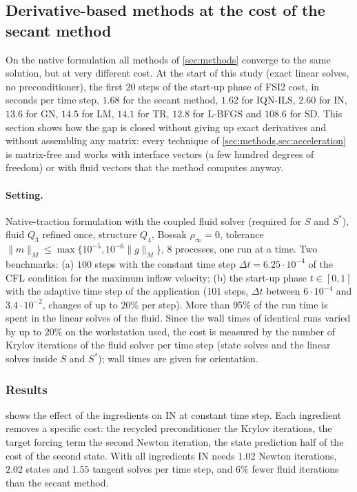 \documentclass[11pt,a4paper]{article}
\theoremstyle{definition}
\theoremstyle{remark}
\newcommand{\M}{M}
\begin{document}
\subsection{Derivative-based methods at the cost of the secant method}\label{sec:fast}

On the native formulation all methods of \cref{sec:methods} converge to the same solution, but at
very different cost. At the start of this study (exact linear solves, no preconditioner), the
first $20$ steps of the start-up phase of FSI2 cost, in seconds per time step, $1.68$ for the
secant method, $1.62$ for IQN-ILS, $2.60$ for IN, $13.6$ for GN, $14.5$ for LM, $14.1$ for TR,
$12.8$ for L-BFGS and $108.6$ for SD. This section shows how the gap is closed without giving up
exact derivatives and without assembling any matrix: every technique of \cref{sec:methods,sec:acceleration} is matrix-free and
works with interface vectors (a few hundred degrees of freedom) or with fluid vectors that the
method computes anyway.

\paragraph{Setting.} Native-traction formulation with the coupled fluid solver (required for $S$
and $S^*$), fluid $Q_3$ refined once, structure $Q_4$, Bossak $\rho_\infty=0$, tolerance
$\|m\|_{\M}\le\max\{10^{-5},10^{-6}\|g\|_{\M}\}$, $8$ processes, one run at a time. Two
benchmarks: (a) $100$ steps with the constant time step $\Delta t=6.25\cdot10^{-4}$ of the CFL
condition for the maximum inflow velocity; (b) the start-up phase $t\in[0,1]$ with the adaptive time
step of the application ($101$ steps, $\Delta t$ between $6\cdot10^{-4}$ and $3.4\cdot10^{-2}$,
changes of up to $20\%$ per step). More than $95\%$ of the run time is spent in the linear solves
of the fluid. Since the wall times of identical runs varied by up to $20\%$ on the workstation used,
the cost is measured by the number of Krylov iterations of the fluid solver per time step (state
solves and the linear solves inside $S$ and $S^*$); wall times are given for orientation.

\subsubsection{Results}\label{sec:fast_results}

 shows the effect of the ingredients on IN at constant time step. Each
ingredient removes a specific cost: the recycled preconditioner the Krylov iterations, the target
forcing term the second Newton iteration, the state prediction half of the cost of the second state.
With all ingredients IN needs $1.02$ Newton iterations, $2.02$ states and $1.55$ tangent solves per
time step, and $6\%$ fewer fluid iterations than the secant method.
\end{document}
